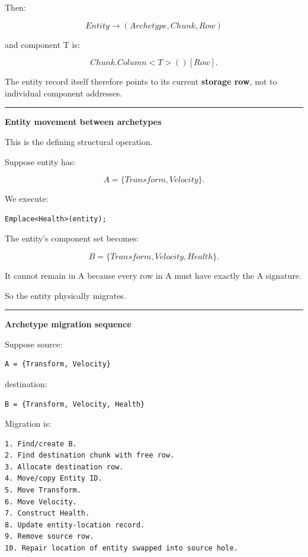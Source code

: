 Then:

\[
Entity
\rightarrow
(Archetype,Chunk,Row)
\]

and component T is:

\[
Chunk.Column<T>()[Row].
\]

The entity record itself therefore points to its current \textbf{storage row}, not to individual component addresses.

\begin{center}\rule{0.5\linewidth}{0.5pt}\end{center}

\textbf{Entity movement between archetypes}

This is the defining structural operation.

Suppose entity has:

\[
A=\{Transform,Velocity\}.
\]

We execute:

\begin{verbatim}
Emplace<Health>(entity);
\end{verbatim}

The entity's component set becomes:

\[
B=\{Transform,Velocity,Health\}.
\]

It cannot remain in A because every row in A must have exactly the A signature.

So the entity physically migrates.

\begin{center}\rule{0.5\linewidth}{0.5pt}\end{center}

\textbf{Archetype migration sequence}

Suppose source:

\begin{verbatim}
A = {Transform, Velocity}
\end{verbatim}

destination:

\begin{verbatim}
B = {Transform, Velocity, Health}
\end{verbatim}

Migration is:

\begin{verbatim}
1. Find/create B.
2. Find destination chunk with free row.
3. Allocate destination row.
4. Move/copy Entity ID.
5. Move Transform.
6. Move Velocity.
7. Construct Health.
8. Update entity-location record.
9. Remove source row.
10. Repair location of entity swapped into source hole.
\end{verbatim}

